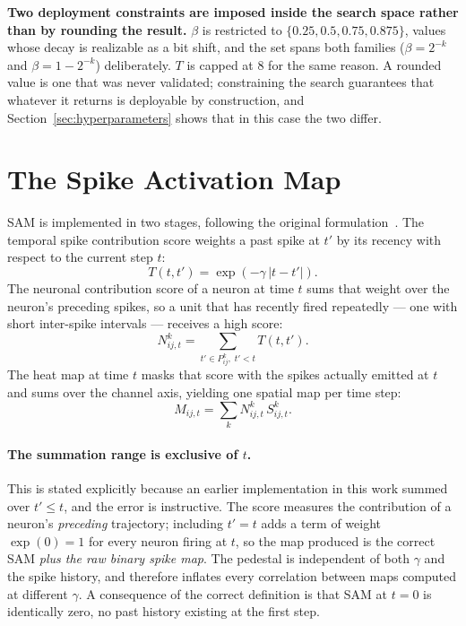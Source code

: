 \textbf{Two deployment constraints are imposed inside the search space rather
than by rounding the result.} $\beta$ is restricted to
$\{0.25, 0.5, 0.75, 0.875\}$, values whose decay is realizable as a bit shift,
and the set spans both families ($\beta = 2^{-k}$ and $\beta = 1 - 2^{-k}$)
deliberately. $T$ is capped at 8 for the same reason. A rounded value is one that
was never validated; constraining the search guarantees that whatever it returns
is deployable by construction, and Section~\ref{sec:hyperparameters} shows that
in this case the two differ.

\section{The Spike Activation Map}
\label{sec:sam-method}

SAM is implemented in two stages, following the original
formulation~\cite{kim2021sam}. The temporal spike contribution score weights a
past spike at $t'$ by its recency with respect to the current step $t$:
\begin{equation}
T(t, t') = \exp\left(-\gamma\,|t - t'|\right).
\end{equation}
The neuronal contribution score of a neuron at time $t$ sums that weight over the
neuron's preceding spikes, so a unit that has recently fired repeatedly --- one
with short inter-spike intervals --- receives a high score:
\begin{equation}
N^{k}_{ij,t} = \sum_{t' \in P^{k}_{ij},\; t' < t} T(t, t') .
\label{eq:ncs}
\end{equation}
The heat map at time $t$ masks that score with the spikes actually emitted at $t$
and sums over the channel axis, yielding one spatial map per time step:
\begin{equation}
M_{ij,t} = \sum_{k} N^{k}_{ij,t}\, S^{k}_{ij,t} .
\end{equation}

\paragraph{The summation range is exclusive of $t$.} This is stated explicitly
because an earlier implementation in this work summed over $t' \leq t$, and the
error is instructive. The score measures the contribution of a neuron's
\emph{preceding} trajectory; including $t' = t$ adds a term of weight
$\exp(0) = 1$ for every neuron firing at $t$, so the map produced is the correct
SAM \emph{plus the raw binary spike map}. The pedestal is independent of both
$\gamma$ and the spike history, and therefore inflates every correlation between
maps computed at different $\gamma$. A consequence of the correct definition is
that SAM at $t = 0$ is identically zero, no past history existing at the first
step.

